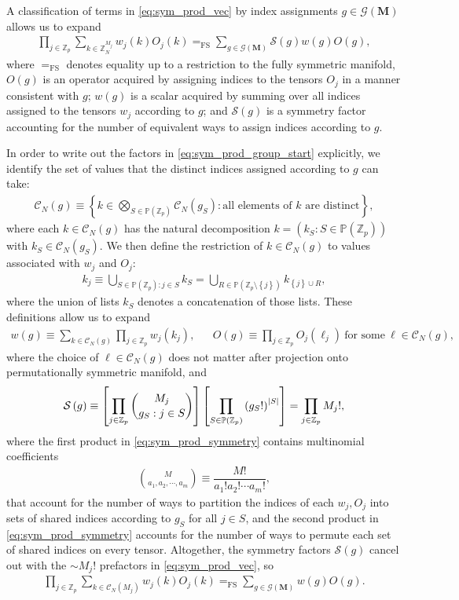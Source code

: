 \documentclass[nofootinbib,notitlepage,11pt]{revtex4-2}
\renewcommand{\t}{\text} %
\newcommand{\f}[2]{\dfrac{#1}{#2}} %
\newcommand{\p}[1]{\left(#1\right)} %
\renewcommand{\sp}[1]{\left[#1\right]} %
\renewcommand{\set}[1]{\left\{#1\right\}} %
\newcommand{\m}{\bm} %
\newcommand{\1}{\mathds{1}}
\newcommand{\C}{\mathcal{C}}
\newcommand{\G}{\mathcal{G}}
\renewcommand{\S}{\mathcal{S}}
\newcommand{\PP}{\mathbb{P}}
\newcommand{\ZZ}{\mathbb{Z}}
\newcommand{\EQFS}{=_{\text{FS}}}
\begin{document}
A classification of terms in \eqref{eq:sym_prod_vec} by index
assignments $g\in\G\p{\m M}$ allows us to expand
\begin{align}
  \prod_{j\in\ZZ_p} \sum_{k\in\ZZ_N^{M_j}} w_j\p{k} O_j\p{k}
  \EQFS \sum_{g\in\G\p{\m M}} \S\p{g} w\p{g} O\p{g},
  \label{eq:sym_prod_group_start}
\end{align}
where $\EQFS$ denotes equality up to a restriction to the fully
symmetric manifold, $O\p{g}$ is an operator acquired by assigning
indices to the tensors $O_j$ in a manner consistent with $g$; $w\p{g}$
is a scalar acquired by summing over all indices assigned to the
tensors $w_j$ according to $g$; and $\S\p{g}$ is a symmetry factor
accounting for the number of equivalent ways to assign indices
according to $g$.

In order to write out the factors in \eqref{eq:sym_prod_group_start}
explicitly, we identify the set of values that the distinct indices
assigned according to $g$ can take:
\begin{align}
  \C_N\p{g}
  \equiv \set{ k \in \bigotimes_{S\in\PP\p{\ZZ_p}} \C_N\p{g_S}
    : \t{all elements of $k$ are distinct} },
\end{align}
where each $k\in\C_N\p{g}$ has the natural decomposition
$k=\p{k_S:S\in\PP\p{\ZZ_p}}$ with $k_S\in\C_N\p{g_S}$.  We then define
the restriction of $k\in\C_N\p{g}$ to values associated with $w_j$ and
$O_j$:
\begin{align}
  k_j \equiv \bigcup_{S\in\PP\p{\ZZ_p} : j\in S} k_S
  = \bigcup_{R\in\PP\p{\ZZ_p\setminus\set{j}}} k_{\set{j}\cup R},
\end{align}
where the union of lists $k_S$ denotes a concatenation of those lists.
These definitions allow us to expand
\begin{align}
  w\p{g} \equiv \sum_{k\in\C_N\p{g}} \prod_{j\in\ZZ_p} w_j\p{k_j},
  &&
  O\p{g} \equiv \prod_{j\in\ZZ_p}
  O_j\p{\ell_j}~\t{for some}~\ell\in\C_N\p{g},
\end{align}
where the choice of $\ell\in\C_N\p{g}$ does not matter after
projection onto permutationally symmetric manifold, and
\begin{align}
  \S\p{g} \equiv \sp{\prod_{j\in\ZZ_p} { M_j \choose g_S : j\in S }}
  \sp{\prod_{S\in\PP\p{\ZZ_p}} \p{g_S!}^\abs{S}}
  = \prod_{j\in\ZZ_p} M_j!,
  \label{eq:sym_prod_symmetry}
\end{align}
where the first product in \eqref{eq:sym_prod_symmetry} contains
multinomial coefficients
\begin{align}
  { M \choose a_1, a_2, \cdots, a_m }
  \equiv \f{M!}{a_1!a_2!\cdots a_m!},
\end{align}
that account for the number of ways to partition the indices of each
$w_j,O_j$ into sets of shared indices according to $g_S$ for all
$j\in S$, and the second product in \eqref{eq:sym_prod_symmetry}
accounts for the number of ways to permute each set of shared indices
on every tensor.  Altogether, the symmetry factors $\S\p{g}$ cancel
out with the $\sim M_j!$ prefactors in \eqref{eq:sym_prod_vec}, so
\begin{align}
  \prod_{j\in\ZZ_p} \sum_{k\in\C_N\p{M_j}} w_j\p{k} O_j\p{k}
  \EQFS \sum_{g\in\G\p{\m M}} w\p{g} O\p{g}.
  \label{eq:sym_prod_group}
\end{align}
\end{document}
